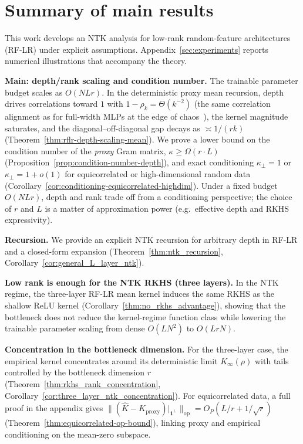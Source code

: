 \newpage
\tableofcontents
\clearpage

\section{Summary of main results}\label{appendix:summary}

This work develops an NTK analysis for low-rank random-feature architectures (RF-LR) under explicit assumptions. Appendix~\ref{sec:experiments} reports numerical illustrations that accompany the theory.

\textbf{Main: depth/rank scaling and condition number.} The trainable parameter budget scales as \(O(NLr)\). In the deterministic proxy mean recursion, depth drives correlations toward \(1\) with \(1-\rho_k=\Theta(k^{-2})\) (the same correlation alignment as for full-width MLPs at the edge of chaos~\cite{terjek2025mlpsateoc,pmlr-v163-hayou22a}), the kernel magnitude saturates, and the diagonal--off-diagonal gap decays as \(\asymp 1/(rk)\) (Theorem~\ref{thm:rflr-depth-scaling-mean}). We prove a lower bound on the condition number of the \emph{proxy} Gram matrix, \(\kappa\ge\Omega(r\cdot L)\) (Proposition~\ref{prop:condition-number-depth}), and exact conditioning \(\kappa_\perp=1\) or \(\kappa_\perp=1+o(1)\) for equicorrelated or high-dimensional random data (Corollary~\ref{cor:conditioning-equicorrelated-highdim}). Under a fixed budget \(O(NLr)\), depth and rank trade off from a conditioning perspective; the choice of \(r\) and \(L\) is a matter of approximation power (e.g.\ effective depth and RKHS expressivity).

\textbf{Recursion.} We provide an explicit NTK recursion for arbitrary depth in RF-LR and a closed-form expansion (Theorem~\ref{thm:ntk_recursion}, Corollary~\ref{cor:general_L_layer_ntk}).

\textbf{Low rank is enough for the NTK RKHS (three layers).} In the NTK regime, the three-layer RF-LR mean kernel induces the same RKHS as the shallow ReLU kernel (Corollary~\ref{thm:no_rkhs_advantage}), showing that the bottleneck does not reduce the kernel-regime function class while lowering the trainable parameter scaling from dense \(O(LN^2)\) to \(O(LrN)\).

\textbf{Concentration in the bottleneck dimension.} For the three-layer case, the empirical kernel concentrates around its deterministic limit \(K_\infty(\rho)\) with tails controlled by the bottleneck dimension \(r\) (Theorem~\ref{thm:rkhs_rank_concentration}, Corollary~\ref{cor:three_layer_ntk_concentration}). For equicorrelated data, a full proof in the appendix gives \(\|(\hat{K}-K_{\mathrm{proxy}})|_{\mathbf{1}^\perp}\|_{\mathrm{op}}=O_P(L/r+1/\sqrt{r})\) (Theorem~\ref{thm:equicorrelated-op-bound}), linking proxy and empirical conditioning on the mean-zero subspace.

